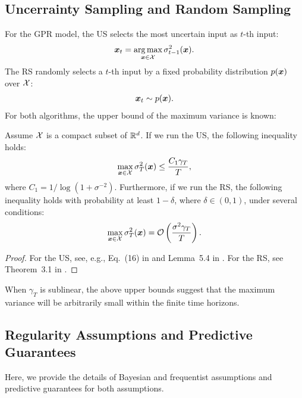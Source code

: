 \subsection{Uncerrainty Sampling and Random Sampling}
%
For the GPR model, the US selects the most uncertain input as $t$-th input:
\begin{align*}
    \boldsymbol{x}_t = \operatorname*{arg\,max}_{\boldsymbol{x} \in {\cal X}} \sigma^2_{t-1}(\boldsymbol{x}).
\end{align*}
%
The RS randomly selects a $t$-th input by a fixed probability distribution $p(\boldsymbol{x})$ over ${\cal X}$:
\begin{align*}
    \boldsymbol{x}_t \sim p(\boldsymbol{x}).
\end{align*}
%
For both algorithms, the upper bound of the maximum variance is known:
\begin{proposition}
    Assume ${\cal X}$ is a compact subset of $\mathbb{R}^d$.
    If we run the US, the following inequality holds:
    \begin{align*}
        \max_{\boldsymbol{x} \in {\cal X}} \sigma^2_T (\boldsymbol{x}) \leq \frac{C_1 \gamma_T}{T},
    \end{align*}
    where $C_1 = 1 / \log(1 + \sigma^{-2})$.
    Furthermore, if we run the RS, the following inequality holds with probability at least $1 - \delta$, where $\delta \in (0, 1)$, under several conditions:
    \begin{align*}
        \max_{\boldsymbol{x} \in {\cal X}} \sigma^2_T (\boldsymbol{x}) = {\cal O} \left(\frac{\sigma^2\gamma_T}{T}\right).
    \end{align*}
    \label{prop:us_rs}
\end{proposition}
\begin{proof}
    For the US, see, e.g., Eq.~(16) in \citet{vakili2021-optimal} and Lemma~5.4 in \citet{Srinivas2010-Gaussian}.
    For the RS, see Theorem~3.1 in \citet{salgia2024random}.
\end{proof}
When $\gamma_T$ is sublinear, the above upper bounds suggest that the maximum variance will be arbitrarily small within the finite time horizons.



\subsection{Regularity Assumptions and Predictive Guarantees}

%
Here, we provide the details of Bayesian and frequentist assumptions and predictive guarantees for both assumptions.


